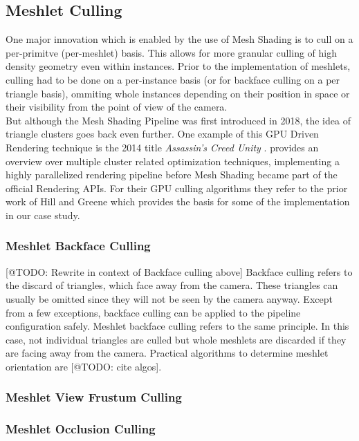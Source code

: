 \subsection{Meshlet Culling} \label{subsec-meshlet-culling}

One major innovation which is enabled by the use of Mesh Shading is to cull on a per-primitve (per-meshlet) basis. 
This allows for more granular culling of high density geometry even within instances. Prior to the implementation 
of meshlets, culling had to be done on a per-instance basis (or for backface culling on a per triangle basis), 
ommiting whole instances depending on their position in space or their visibility from the point of view of the camera.\\

\noindent
But although the Mesh Shading Pipeline was first introduced in 2018, the idea of triangle clusters goes back even further.
One example of this \ac{GPU} Driven Rendering technique is the 2014 title \emph{Assassin's Creed Unity} \cite{Ubisoft2014}.
\cite{Aaltonen2015} provides an overview over multiple cluster related optimization techniques, implementing a highly 
parallelized rendering pipeline before Mesh Shading became part of the official Rendering \ac{API}s.
For their \ac{GPU} culling algorithms they refer to the prior work of Hill \cite{Hill11} and Greene \cite{Greene93} which 
provides the basis for some of the implementation in our case study.


\subsubsection{Meshlet Backface Culling} \label{subsubsec-meshlet-backface-culling}

[@TODO: Rewrite in context of Backface culling above]
Backface culling refers to the discard of triangles, which face away from the camera. These triangles can usually be omitted 
since they will not be seen by the camera anyway. Except from a few exceptions, backface culling can be applied to the 
pipeline configuration safely. Meshlet backface culling refers to the same principle. In this case, not individual triangles  
are culled but whole meshlets are discarded if they are facing away from the camera. Practical algorithms to determine meshlet 
orientation are [@TODO: cite algos].\\ %


\subsubsection{Meshlet View Frustum Culling} \label{subsubsec-meshlet-view-frustum-culling}

\subsubsection{Meshlet Occlusion Culling} \label{subsubsec-meshlet-occlusion-culling}